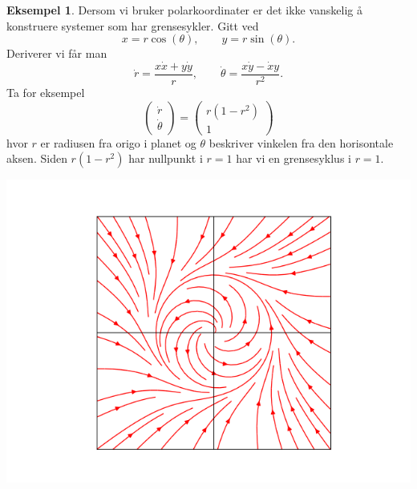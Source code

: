 \documentclass{article}
\theoremstyle{plain}
\theoremstyle{definition}
\newtheorem{eksempel}[teorem]{Eksempel}
\theoremstyle{remark}
\begin{document}
\begin{eksempel}
    Dersom vi bruker polarkoordinater er det ikke vanskelig å konstruere systemer som har grensesykler. Gitt ved
    \begin{equation*}
        x = r \cos(\theta), \qquad y = r \sin(\theta).
    \end{equation*}
    Deriverer vi får man
    \begin{equation*}
        \dot{r} = \frac{x\dot{x} + y \dot{y}}{r}, \qquad \dot{\theta} = \frac{x\dot{y} - \dot{x}y}{r^2}.
    \end{equation*}
    Ta for eksempel
    \begin{equation*}
        \begin{pmatrix}
            \dot{r} \\
            \dot{\theta}
        \end{pmatrix}
        =
        \begin{pmatrix}
            r(1-r^2) \\
            1
        \end{pmatrix}
    \end{equation*}
    hvor $r$ er radiusen fra origo i planet og $\theta$ beskriver vinkelen fra den horisontale aksen. Siden $r(1-r^2)$ har nullpunkt i $r = 1$ har vi en grensesyklus i $r = 1$.
    \begin{center}
        \includegraphics[scale=0.5]{phase_plane_radial.png}
    \end{center}
\end{eksempel}
\end{document}
